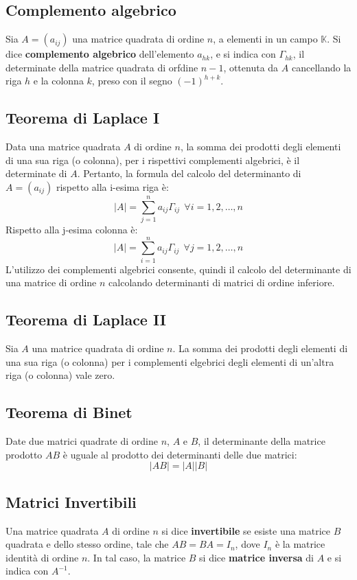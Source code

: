 \documentclass[../main.tex]{subfiles}
\begin{document}
\subsection{Complemento algebrico}
Sia $A= (a_{ij})$ una matrice quadrata di ordine $n$, a elementi in un campo
$\mathbb{K}$. Si dice \textbf{complemento algebrico} dell'elemento $a_{hk}$, e
si indica con $\Gamma_{hk}$, il determinate della matrice quadrata di orfdine
$n-1$, ottenuta da $A$ cancellando la riga $h$ e la colonna $k$, preso con il
segno $ (-1)^{h+k} $.

\subsection{Teorema di Laplace I}
Data una matrice quadrata $A$ di ordine $n$, la somma dei prodotti degli
elementi di una sua riga (o colonna), per i rispettivi complementi algebrici, è
il determinate di $A$. Pertanto, la formula del calcolo del determinanto di $A=
    (a_{ij})$ rispetto alla i-esima riga è:
\[
    |A| = \sum_{j=1}^n a_{ij}\Gamma_{ij} \ \ \forall i = 1, 2, \ldots, n
\]
Rispetto alla j-esima colonna è:
\[
    |A| = \sum_{i=1}^n a_{ij}\Gamma_{ij} \ \ \forall j = 1, 2, \ldots, n
\]
L'utilizzo dei complementi algebrici consente, quindi il calcolo del
determinante di una matrice di ordine $n$ calcolando determinanti di matrici di
ordine inferiore.

\subsection{Teorema di Laplace II}
Sia $A$ una matrice quadrata di ordine $n$. La somma dei prodotti degli
elementi di una sua riga (o colonna) per i complementi elgebrici degli elementi
di un'altra riga (o colonna) vale zero.

\subsection{Teorema di Binet}
Date due matrici quadrate di ordine $n$, $A$ e $B$, il determinante della
matrice prodotto $AB$ è uguale al prodotto dei determinanti delle due matrici:
\[
    |AB| = |A||B|
\]

\subsection{Matrici Invertibili}
Una matrice quadrata $A$ di ordine $n$ si dice \textbf{invertibile} se esiste
una matrice $B$ quadrata e dello stesso ordine, tale che $AB = BA = I_n$, dove
$I_n$ è la matrice identità di ordine $n$. In tal caso, la matrice $B$ si dice
\textbf{matrice inversa} di $A$ e si indica con $A^{-1}$.
\end{document}

